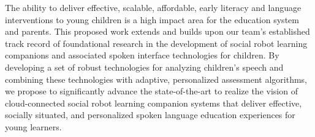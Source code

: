 The ability to deliver effective, scalable, affordable, early literacy and language interventions to young children is a high impact area for the education system and parents. This proposed work extends and builds upon our team's established track record of foundational research in the development of social robot learning companions and associated spoken interface technologies for children. By developing a set of robust technologies for analyzing children's speech and combining these technologies with adaptive, personalized assessment algorithms, we propose to significantly advance the state-of-the-art to realize the vision of cloud-connected social robot learning companion systems that deliver effective, socially situated, and personalized spoken language education experiences for young learners.\\



